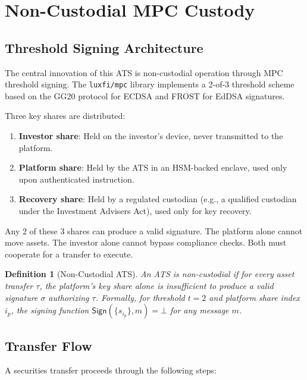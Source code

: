 \documentclass[11pt,a4paper]{article}
\newtheorem{definition}{Definition}
\begin{document}
\section{Non-Custodial MPC Custody}\label{sec:mpc}

\subsection{Threshold Signing Architecture}

The central innovation of this ATS is non-custodial operation through MPC threshold signing. The \texttt{luxfi/mpc} library implements a 2-of-3 threshold scheme based on the GG20 protocol for ECDSA and FROST for EdDSA signatures.

Three key shares are distributed:

\begin{enumerate}[nosep]
  \item \textbf{Investor share}: Held on the investor's device, never transmitted to the platform.
  \item \textbf{Platform share}: Held by the ATS in an HSM-backed enclave, used only upon authenticated instruction.
  \item \textbf{Recovery share}: Held by a regulated custodian (e.g., a qualified custodian under the Investment Advisers Act), used only for key recovery.
\end{enumerate}

Any 2 of these 3 shares can produce a valid signature. The platform alone cannot move assets. The investor alone cannot bypass compliance checks. Both must cooperate for a transfer to execute.

\begin{definition}[Non-Custodial ATS]
An ATS is \emph{non-custodial} if for every asset transfer $\tau$, the platform's key share alone is insufficient to produce a valid signature $\sigma$ authorizing $\tau$. Formally, for threshold $t = 2$ and platform share index $i_p$, the signing function $\textsf{Sign}(\{s_{i_p}\}, m) = \bot$ for any message $m$.
\end{definition}

\subsection{Transfer Flow}

A securities transfer proceeds through the following steps:
\end{document}

